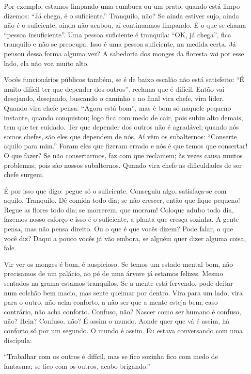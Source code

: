 Por exemplo, estamos limpando uma cumbuca ou um prato, quando está
limpo dizemos: “Já chega, é o suficiente.” Tranquilo, não? Se ainda
estiver sujo, ainda não é o suficiente, ainda não acabou, aí
continuamos limpando. É o que se chama “pessoa insuficiente”. Uma
pessoa suficiente é tranquila: “OK, já chega”, fica tranquilo e não se
preocupa. Isso é uma pessoa suficiente, na medida certa. Já pensou
dessa forma alguma vez? A sabedoria dos monges da floresta vai por esse
lado, ela não voa muito alto.

Vocês funcionários públicos também, se é de baixo escalão não está
satisfeito: “É muito difícil ter que depender dos outros”, reclama que
é difícil. Então vai desejando, desejando, buscando o caminho e no
final vira chefe, vira líder. Quando vira chefe pensa: “Agora está
bom”, mas é bom só naquele pequeno instante, quando conquistou; logo
fica com medo de cair, pois subiu alto demais, tem que ter cuidado. Ter
que depender dos outros não é agradável; quando nós somos chefes, são
eles que dependem de nós. Aí vêm os subalternos: “Conserte aquilo para
mim.” Foram eles que fizeram errado e nós é que temos que consertar! O
que fazer? Se não consertarmos, faz com que reclamem; às vezes causa
muitos problemas, pois são nossos subalternos. Quando vira chefe as
dificuldades de ser chefe surgem.

É por isso que digo: pegue só o suficiente. Conseguiu algo,
satisfaça-se com aquilo. Tranquilo. Dê comida todo dia; se não crescer,
então que fique pequeno! Regue as flores todo dia; se morrerem, que
morram! Coloque adubo todo dia, fazemos nosso esforço e isso é o
suficiente, a planta que cresça sozinha. A gente pensa, mas não pensa
direito. Ou o que é que vocês dizem? Pode falar, o que você diz? Daqui
a pouco vocês já vão embora, se alguém quer dizer alguma coisa, fale. 

Vir ver os monges é bom, é auspicioso. Se temos um estado mental
bom, não precisamos de um palácio, ao pé de uma árvore já estamos
felizes. Mesmo sentados na grama estamos tranquilos. Se a mente está
fervendo, pode deitar num colchão bem macio, mas sente queimar por
dentro. Vira para um lado, vira para o outro, não acha conforto, a não
ser que a mente esteja bem; caso contrário, não acha conforto. Confuso,
não? Nascer como ser humano é confuso, não? Hein? Confuso, não? É assim
o mundo. Aonde quer que vá é assim, há conforto só por um segundo. O
mundo é assim. Eu estava conversando com uma discípula: 

“Trabalhar com os outros é difícil, mas se fico sozinha fico com
medo de fantasma; se fico com os outros, acabo brigando.”

